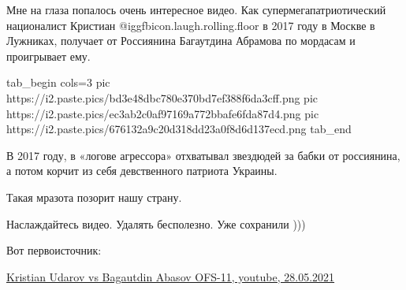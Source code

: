 Мне на глаза попалось очень интересное видео. Как супермегапатриотический
националист Кристиан  @igg{fbicon.laugh.rolling.floor}  в 2017 году в Москве в
Лужниках, получает от Россиянина Багаутдина Абрамова по мордасам и проигрывает
ему.


\ifcmt
  tab_begin cols=3
     pic https://i2.paste.pics/bd3e48dbc780e370bd7ef388f6da3cff.png
		 pic https://i2.paste.pics/ec3ab2c0af97169a772bbafe6fda87d4.png
		 pic https://i2.paste.pics/676132a9c20d318dd23a0f8d6d137ecd.png
  tab_end
\fi

В 2017 году, в «логове агрессора» отхватывал звездюдей за бабки от россиянина,
а потом корчит из себя девственного патриота Украины. 

Такая мразота позорит нашу страну. 

Наслаждайтесь видео. Удалять бесполезно. Уже сохранили )))

Вот первоисточник: 

\href{https://youtu.be/o2B1e1eZoH0}{%
Kristian Udarov vs Bagautdin Abasov OFS-11, youtube, 28.05.2021%
}
